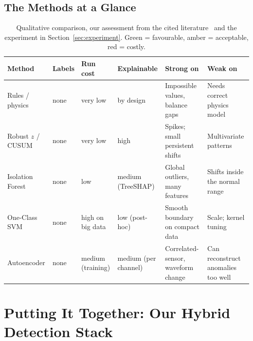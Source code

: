 \documentclass[11pt,a4paper]{article}
\begin{document}
\subsection{The Methods at a Glance}
\begin{table}[H]
\centering
\small
\renewcommand{\arraystretch}{1.15}
\begin{tabularx}{\textwidth}{@{}>{\raggedright\arraybackslash}p{2.3cm}>{\raggedright\arraybackslash}p{1.2cm}>{\raggedright\arraybackslash}p{1.8cm}>{\raggedright\arraybackslash}p{2.2cm}LL@{}}
\toprule
\textbf{Method} & \textbf{Labels} & \textbf{Run cost} & \textbf{Explainable} & \textbf{Strong on} & \textbf{Weak on} \\
\midrule
Rules / physics & none & very low & by design & Impossible values, balance gaps & Needs correct physics model \\
Robust $z$ / CUSUM & none & very low & high & Spikes; small persistent shifts & Multivariate patterns \\
Isolation Forest & none & low & medium (TreeSHAP) & Global outliers, many features & Shifts inside the normal range \\
One-Class SVM & none & high on big data & low (post-hoc) & Smooth boundary on compact data & Scale; kernel tuning \\
Autoencoder & none & medium (training) & medium (per channel) & Correlated-sensor, waveform change & Can reconstruct anomalies too well \\
\bottomrule
\end{tabularx}
\caption{Qualitative comparison, our assessment from the cited literature~\cite{chandola,pang} and the
experiment in Section~\ref{sec:experiment}. Green = favourable, amber = acceptable, red = costly.}
\label{tab:glance}
\end{table}

\section{Putting It Together: Our Hybrid Detection Stack}
\label{sec:stack}
\end{document}
